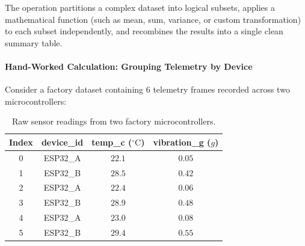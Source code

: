 \begin{keyidea}
The \textbf{} operation partitions a complex dataset into logical subsets, applies a mathematical function (such as mean, sum, variance, or custom transformation) to each subset independently, and recombines the results into a single clean summary table.
\end{keyidea}

\paragraph{Hand-Worked Calculation: Grouping Telemetry by Device}
Consider a factory dataset containing 6 telemetry frames recorded across two microcontrollers:

\begin{table}[htbp]
\centering
\small
\begin{tabular}{cccc}
\toprule
\textbf{Index} & \textbf{device\_id} & \textbf{temp\_c} ($^\circ\text{C}$) & \textbf{vibration\_g} ($g$) \\
\midrule
0 & ESP32\_A & $22.1$ & $0.05$ \\
1 & ESP32\_B & $28.5$ & $0.42$ \\
2 & ESP32\_A & $22.4$ & $0.06$ \\
3 & ESP32\_B & $28.9$ & $0.48$ \\
4 & ESP32\_A & $23.0$ & $0.08$ \\
5 & ESP32\_B & $29.4$ & $0.55$ \\
\bottomrule
\end{tabular}
\caption{Raw sensor readings from two factory microcontrollers.}\label{tab:raw_telemetry}
\end{table}

